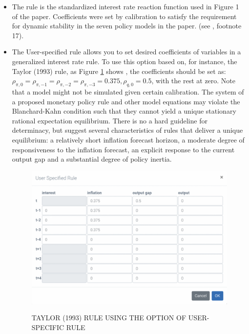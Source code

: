 \documentclass[11pt,a4paper]{article}
\begin{document}
\begin{itemize}
	\item The \cite{Coenenetal2012} rule is the standardized interest rate reaction function used in Figure 1 of the paper. Coefficients were set by calibration to satisfy the requirement for dynamic stability in the seven policy models in the paper. (see \cite{Coenenetal2012}, footnote 17).   
	\item The User-specified rule allows you to set desired coefficients of variables in a generalized interest rate rule. To use this option based on, for instance, the Taylor (1993) rule, as Figure \ref{img:MenuStructure3} shows , the coefficients should be set as: $ \rho_{\pi,0} = \rho_{\pi,-1} = \rho_{\pi,-2} = \rho_{\pi,-3} = 0.375, \rho_{q,0} = 0.5 $, with the rest at zero. Note that a model might not be simulated given certain calibration. The system of a proposed monetary policy rule and other model equations may violate the Blanchard-Kahn condition such that they cannot yield a unique stationary rational expectation equilibrium. There is no a hard guideline for determinacy, but \cite{LevinWielandWilliams2003} suggest several characteristics of rules that deliver a unique equilibrium: a relatively short inflation forecast horizon, a moderate degree of responsiveness to the inflation forecast, an explicit response to the current output gap and a substantial degree of policy inertia. \\

\begin{figure}[H]
\centering
\caption{\textsc{TAYLOR (1993) RULE USING THE OPTION OF USER-SPECIFIC RULE }}
\vspace{0.2cm}
\includegraphics[width=15cm,keepaspectratio]{userrule.png}%
\label{img:MenuStructure3}
\end{figure}


\end{itemize}
\end{document}

